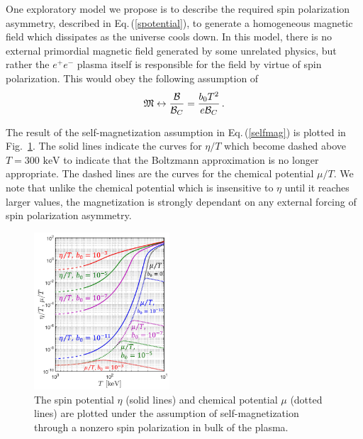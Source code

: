 \documentclass[reprint]{revtex4-2}
\newcommand*{\keV}{\text{ keV}}
\newcommand{\req}[1]{Eq.\,(\ref{#1})}
\newcommand{\rf}[1]{Fig.~{\ref{#1}}}
\begin{document}
One exploratory model we propose is to describe the required spin polarization asymmetry, described in \req{spotential}, to generate a homogeneous magnetic field which dissipates as the universe cools down. In this model, there is no external primordial magnetic field generated by some unrelated physics, but rather the $e^{+}e^{-}$ plasma itself is responsible for the field by virtue of spin polarization. This would obey the following assumption of
\begin{align}
    \label{selfmag}
    {\mathfrak M}\leftrightarrow\frac{\cal B}{{\cal B}_{C}}=\frac{b_{0}T^{2}}{e{\cal B}_{C}}\,.
\end{align}

The result of the self-magnetization assumption in \req{selfmag} is plotted in \rf{fig:self}. The solid lines indicate the curves for $\eta/T$ which become dashed above $T=300\keV$ to indicate that the Boltzmann approximation is no longer appropriate. The dashed lines are the curves for the chemical potential $\mu/T$. We note that unlike the chemical potential which is insensitive to $\eta$ until it reaches larger values, the magnetization is strongly dependant on any external forcing of spin polarization asymmetry.

\begin{figure}[ht]
    \centering
    \includegraphics[width=0.45\textwidth]{plots/Spinchemical_02.png}
    \caption{The spin potential $\eta$ (solid lines) and chemical potential $\mu$ (dotted lines) are plotted under the assumption of self-magnetization through a nonzero spin polarization in bulk of the plasma.}
    \label{fig:self} 
\end{figure}

\end{document}
